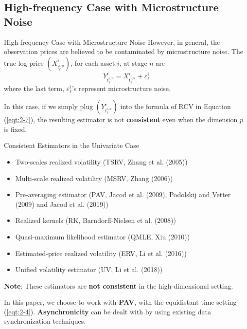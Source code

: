 \documentclass{beamer}
\begin{document}
\subsection{High-frequency Case with Microstructure Noise}

\begin{frame}{High-frequency Case with Microstructure Noise}
However, in general, the observation prices are believed to be contaminated by microstructure noise. The true log-price $(X_{t_{\ell}^{i,n}}^i)$, for each asset $i$, at stage $n$ are
\begin{equation}
\label{eqt:2-9}
Y_{t_{\ell}^{i, n}}^i=X_{t_{\ell}^{i, n}}^i+\varepsilon_{\ell}^i
\end{equation}
where the last term, $\varepsilon_{\ell}^i$'s represent microstructure noise.\newline

In this case, if we simply plug $(Y_{t_{\ell}^{i,n}}^i)$ into the formula of RCV in Equation (\ref{eqt:2-7}), the resulting estimator is not \textbf{consistent} even when the dimension $p$ is fixed.
\end{frame}

\begin{frame}{Consistent Estimators in the Univariate Case}
\begin{itemize}
    \item Two-scales realized volatility (TSRV, Zhang et al. (2005))
    \item Multi-scale realized volatility (MSRV, Zhang (2006))
    \item Pre-averaging estimator (PAV, Jacod et al. (2009), Podolskij and Vetter (2009) and Jacod et al. (2019))
    \item Realized kernels (RK, Barndorff-Nielsen et al. (2008))
    \item Quasi-maximum likelihood estimator (QMLE, Xiu (2010))
    \item Estimated-price realized volatility (ERV, Li et al. (2016))
    \item Unified volatility estimator (UV, Li et al. (2018))
\end{itemize}
\textbf{Note}: These estimators are \textbf{not consistent} in the high-dimensional setting.\newline

In this paper, we choose to work with \textbf{PAV}, with the equidistant time setting (\ref{eqt:2-4}). \textbf{Asynchronicity} can be dealt with by using existing data synchronization techniques.
\end{frame}
\end{document}

